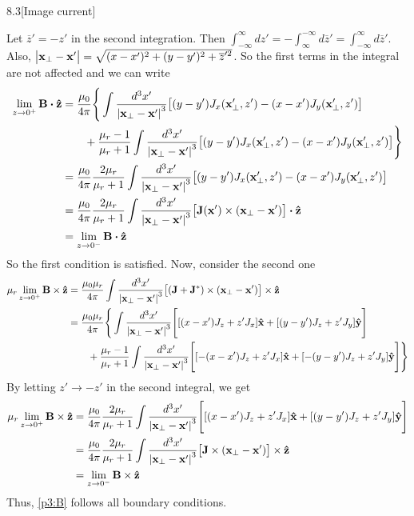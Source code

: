 \documentclass[12pt]{article}
\begin{document}
\begin{problem}{8.3}[Image current]
\begin{solution}
Let $\overline{z}'=-z'$ in the second integration. Then $\int_{-\infty}^\infty
dz'=-\int_{\infty}^{-\infty}d\overline{z}'=\int_{-\infty}^\infty
d\overline{z}'$. Also,
$\abs{\vb{x}_\bot-\vb{x}'}=\sqrt{(x-x')^2+(y-y')^2+\overline{z}'^2}$. So the
first terms in the integral are not affected and we can write
\begin{align}
    \lim_{z\to0^+}\vb{B}\vdot\zhat
    &=\frac{\mu_0}{4\pi}\Bigg\{
        \int\frac{d^3x'}{\abs{\vb{x}_\bot-\vb{x}'}^3}
        \qty[(y-y')J_x(\vb{x}_\bot',z')-(x-x')J_y(\vb{x}_\bot',z')]\notag\\
    &\qquad+\frac{\mu_r-1}{\mu_r+1}
    \int\frac{d^3x'}{\abs{\vb{x}_\bot-\vb{x}'}^3}\qty[
        (y-y')J_x(\vb{x}_\bot',z')-(x-x')J_y(\vb{x}_\bot',z') 
    ]\Bigg\}\notag\\
    &=\frac{\mu_0}{4\pi}\frac{2\mu_r}{\mu_r+1}
    \int\frac{d^3x'}{\abs{\vb{x}_\bot-\vb{x}'}^3}\qty[(y-y')J_x(\vb{x}_\bot',z')-(x-x')J_y(\vb{x}_\bot',z')]\notag\\
    &=\frac{\mu_0}{4\pi}\frac{2\mu_r}{\mu_r+1}
    \int\frac{d^3x'}{\abs{\vb{x}_\bot-\vb{x}'}^3}\qty[\vb{J}(\vb{x}')\times(\vb{x}_\bot-\vb{x}')]\vdot\zhat\notag\\
    &=\lim_{z\to0^-}\vb{B}\vdot\zhat
\end{align}
So the first condition is satisfied. Now, consider the second one
\begin{align}
    \mu_r\lim_{z\to0^+}\vb{B}\times\vb{\hat{z}} 
    &=\frac{\mu_0\mu_r}{4\pi}\int\frac{d^3x'}{\abs{\vb{x}_\bot-\vb{x}'}^3}
    \qty[\qty(\vb{J}+\vb{J}^\ast)\times(\vb{x}_\bot-\vb{x}')]\times\vb{\hat{z}}\notag\\
    &=\frac{\mu_0\mu_r}{4\pi}\Bigg\{
        \int\frac{d^3x'}{\abs{\vb{x}_\bot-\vb{x}'}^3}
        \Bigg[[(x-x')J_z+z'J_x]\vb{\hat{x}}+[(y-y')J_z+z'J_y]\vb{\hat{y}}\Bigg]\notag\\
    &\qquad+\frac{\mu_r-1}{\mu_r+1}
        \int\frac{d^3x'}{\abs{\vb{x}_\bot-\vb{x}'}^3}
        \Bigg[[-(x-x')J_z+z'J_x]\vb{\hat{x}}+[-(y-y')J_z+z'J_y]\vb{\hat{y}}\Bigg]
    \Bigg\}
\end{align}
By letting $z'\to-z'$ in the second integral, we get
\begin{align}
    \mu_r\lim_{z\to0^+}\vb{B}\times\vb{\hat{z}}
    &=\frac{\mu_0}{4\pi}\frac{2\mu_r}{\mu_r+1}
        \int\frac{d^3x'}{\abs{\vb{x}_\bot-\vb{x}'}^3}
        \Bigg[[(x-x')J_z+z'J_x]\vb{\hat{x}}+[(y-y')J_z+z'J_y]\vb{\hat{y}}\Bigg]\notag\\
    &=\frac{\mu_0}{4\pi}\frac{2\mu_r}{\mu_r+1}
        \int\frac{d^3x'}{\abs{\vb{x}_\bot-\vb{x}'}^3}
        \qty[\vb{J}\times(\vb{x}_\bot-\vb{x}')]\times\vb{\hat{z}}\notag\\
    &=\lim_{z\to0^-}\vb{B}\times\vb{\hat{z}}
\end{align}
Thus, \eqref{p3:B} follows all boundary conditions.
\end{solution}
\end{problem}
\end{document}

